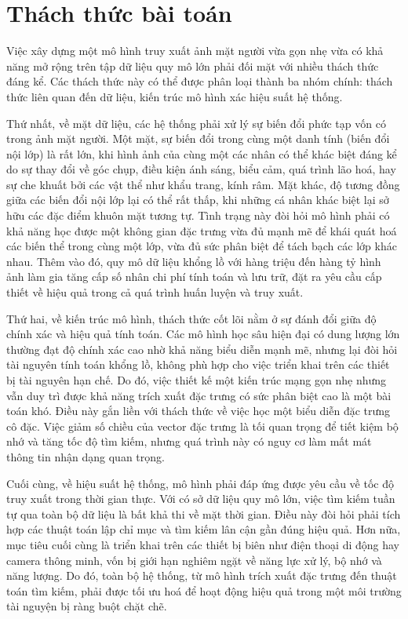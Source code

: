\section{Thách thức bài toán}
Việc xây dựng một mô hình truy xuất ảnh mặt người vừa gọn nhẹ vừa có khả năng mở rộng trên tập dữ liệu quy mô lớn phải đối mặt với nhiều thách thức đáng kể. Các thách thức này có thể được phân loại thành ba nhóm chính: thách thức liên quan đến dữ liệu, kiến trúc mô hình xác hiệu suất hệ thống. 

Thứ nhất, về mặt dữ liệu, các hệ thống phải xử lý sự biến đổi phức tạp vốn có trong ảnh mặt người. Một mặt, sự biến đổi trong cùng một danh tính (biến đổi nội lớp) là rất lớn, khi hình ảnh của cùng một các nhân có thể khác biệt đáng kể do sự thay đổi về góc chụp, điều kiện ánh sáng, biểu cảm, quá trình lão hoá, hay sự che khuất bởi các vật thể như khẩu trang, kính râm. Mặt khác, độ tương đồng giữa các biến đổi nội lớp lại có thể rất thấp, khi những cá nhân khác biệt lại sở hữu các đặc điểm khuôn mặt tương tự. Tình trạng này đòi hỏi mô hình phải có khả năng học được một không gian đặc trưng vừa đủ mạnh mẽ để khái quát hoá các biến thể trong cùng một lớp, vừa đủ sức phân biệt để tách bạch các lớp khác nhau. Thêm vào đó, quy mô dữ liệu khổng lồ với hàng triệu đến hàng tỷ hình ảnh làm gia tăng cấp số nhân chi phí tính toán và lưu trữ, đặt ra yêu cầu cấp thiết về hiệu quả trong cả quá trình huấn luyện và truy xuất.

Thứ hai, về kiến trúc mô hình, thách thức cốt lõi nằm ở sự đánh đổi giữa độ chính xác và hiệu quả tính toán. Các mô hình học sâu hiện đại có dung lượng lớn thường đạt độ chính xác cao nhờ khả năng biểu diễn mạnh mẽ, nhưng lại đòi hỏi tài nguyên tính toán khổng lồ, không phù hợp cho việc triển khai trên các thiết bị tài nguyên hạn chế. Do đó, việc thiết kế một kiến trúc mạng gọn nhẹ nhưng vẫn duy trì được khả năng trích xuất đặc trưng có sức phân biệt cao là một bài toán khó. Điều này gắn liền với thách thức về việc học một biểu diễn đặc trưng cô đặc. Việc giảm số chiều của vector đặc trưng là tối quan trọng để tiết kiệm bộ nhớ và tăng tốc độ tìm kiếm, nhưng quá trình này có nguy cơ làm mất mát thông tin nhận dạng quan trọng.

Cuối cùng, về hiệu suất hệ thống, mô hình phải đáp ứng được yêu cầu về tốc độ truy xuất trong thời gian thực. Với có sở dữ liệu quy mô lớn, việc tìm kiếm tuần tự qua toàn bộ dữ liệu là bất khả thi về mặt thời gian. Điều này đòi hỏi phải tích hợp các thuật toán lập chỉ mục và tìm kiếm lân cận gần đúng hiệu quả. Hơn nữa, mục tiêu cuối cùng là triển khai trên các thiết bị biên như điện thoại di động hay camera thông minh, vốn bị giới hạn nghiêm ngặt về năng lực xử lý, bộ nhớ và năng lượng. Do đó, toàn bộ hệ thống, từ mô hình trích xuất đặc trưng đến thuật toán tìm kiếm, phải được tối ưu hoá để hoạt động hiệu quả trong một môi trường tài nguyện bị ràng buột chặt chẽ.
